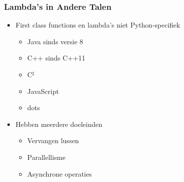 \begin{frame}
  \frametitle{Lambda's in Andere Talen}
  \begin{itemize}
    \item First class functions en lambda's niet Python-specifiek
          \begin{itemize}
            \item Java sinds versie 8
            \item C++ sinds C++11
            \item C$^\sharp$
            \item JavaScript
            \item dots
          \end{itemize}
    \item Hebben meerdere doeleinden
          \begin{itemize}
            \item Vervangen lussen
            \item Parallellisme
            \item Asynchrone operaties
          \end{itemize}
  \end{itemize}
\end{frame}

